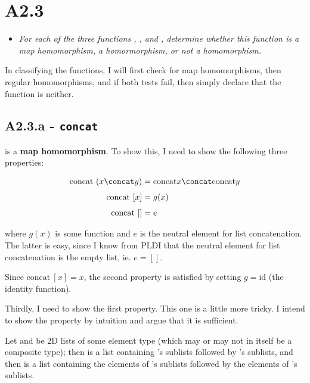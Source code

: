 \newpage

\section{A2.3}

\begin{itemize}
  \item \textit{For each of the three functions , , and
    , determine whether this function is a map homomorphism, a
    homormorphism, or not a homomorphism.}
\end{itemize}


In classifying the functions, I will first check for map homomorphisms, then
regular homomorphisms, and if both tests fail, then simply declare that the
function is neither.

\subsection{A2.3.a - \texttt{concat}}

 is a \textbf{map homomorphism}. To show this, I need to show the
following three properties:

\begin{align*}
  \text{concat}\ (x \concat y) &= \text{concat} x  \concat \text{concat} y \\[4pt]
  \text{concat}\ [x]      &= g(x)\\[4pt]
  \text{concat}\ []       &= e
\end{align*}

where $g(x)$ is some function and $e$ is the neutral element for list
concatenation. The latter is easy, since I know from PLDI that the neutral
element for list concatenation is the empty list, ie. $e = []$.

\medskip

Since $\text{concat}\ [x] = x$, the second property is satisfied by setting $g =
\text{id}$ (the identity function).

\medskip

Thirdly, I need to show the first property. This one is a little more tricky.
I intend to show the property by intuition and argue that it is sufficient.

\smallskip

Let  and  be 2D lists of some element type (which may or may not in
itself be a composite type); then  is a list containing 's
sublists followed by 's sublists, and then  is a
list containing the elements of 's sublists followed by the elements of
's sublists.

